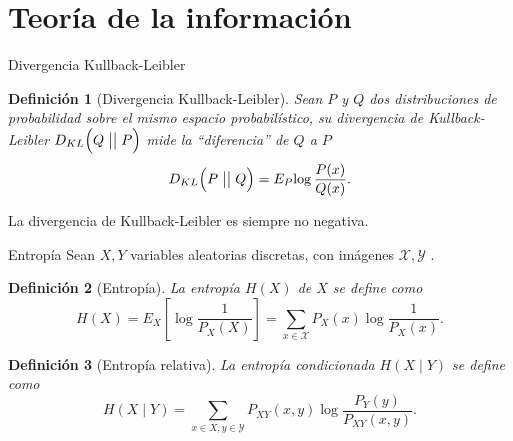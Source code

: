 \documentclass[aspectratio=169]{beamer}
\newcommand\KL[2]{D_{KL}\Big(#1 \bigm|\bigm| #2\Big)}
\newcommand{\X}{\mathcal{X}}
\newtheorem{defi}{Definición}
\begin{document}
  
  \section{Teoría de la información}


\begin{frame}{Divergencia Kullback-Leibler}
  \begin{defi}[Divergencia Kullback-Leibler]
Sean \(P\) y \(Q\) dos distribuciones de probabilidad sobre el mismo espacio probabilístico, su \emph{divergencia de Kullback-Leibler} \(\KL{Q}{P}\) mide la ``diferencia'' de \(Q\) a \(P\)
\[
  \KL{P}{Q} = E_P{\log \frac{P(x)}{Q(x)}}.
\]
  \end{defi}
  La divergencia de Kullback-Leibler es siempre no negativa.

\end{frame}
  

  \begin{frame}{Entropía}
    Sean \(X,Y\) variables aleatorias discretas, con imágenes \(\X, \mathcal Y\) .


    \begin{defi}[Entropía]
    
    
      La entropía \(H(X)\) de \(X\) se define como
      \[
        H(X) = E_X\left[\log\frac{1}{P_X(X)}\right] =  \sum_{x \in \X} P_X(x) \log\frac{1}{P_X(x)}.
      \]
    \end{defi}
    \pause
    \begin{defi}[Entropía relativa]
      La entropía  condicionada \(H(X\mid Y)\) se define como
      \[
        H(X\mid Y) = \sum_{x \in X,y \in \mathcal Y}P_{XY}(x,y)\log\frac{P_Y(y)}{P_{XY}(x,y)}.
      \]
      
      
    \end{defi}

  \end{frame}
\end{document}
